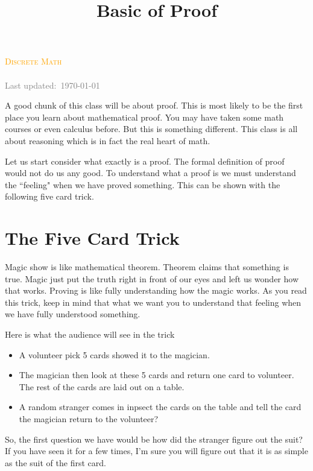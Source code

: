 \documentclass[a4paper, 12pt]{article}
\title{Basic of Proof}
\theoremstyle{examplestyle}
\newcommand{\course}{Discrete Math}
\begin{document}
\begin{center}
	\textcolor{orange}{\textsc{\course}}\\
	\huge\textbf{\textsc{\thetitle}}\\
	\small\textcolor{gray}{Last updated:\, \today \, \currenttime}\\
\end{center}

\begin{multicols}{2}
	
A good chunk of this class will be about proof. This is most likely to be the first place you learn about mathematical proof. You may have taken some math courses or even calculus before. But this is something different. This class is all about reasoning which is in fact the real heart of math.

Let us start consider what exactly is a proof. The formal definition of proof would not do us any good. To understand what a proof is we must understand the ``feeling" when we have proved something. This can be shown with the following five card trick.


\section*{The Five Card Trick}

Magic show is like mathematical theorem. Theorem claims that something is true. Magic just put the truth right in front of our eyes and left us wonder how that works. Proving is like fully understanding how the magic works. As you read this trick, keep in mind that what we want you to understand that feeling when we have fully understood something.

Here is what the audience will see in the trick
\begin{itemize}
	\item A volunteer pick 5 cards showed it to the magician.
	\item The magician then look at these 5 cards and return one card to volunteer. The rest of the cards are laid out on a table.
	\item A random stranger comes in inpsect the cards on the table and tell the card the magician return to the volunteer?
\end{itemize}

So, the first question we have would be how did the stranger figure out the suit? If you have seen it for a few times, I'm sure you will figure out that it is as simple as the suit of the first card. 


\end{multicols}
\end{document}
